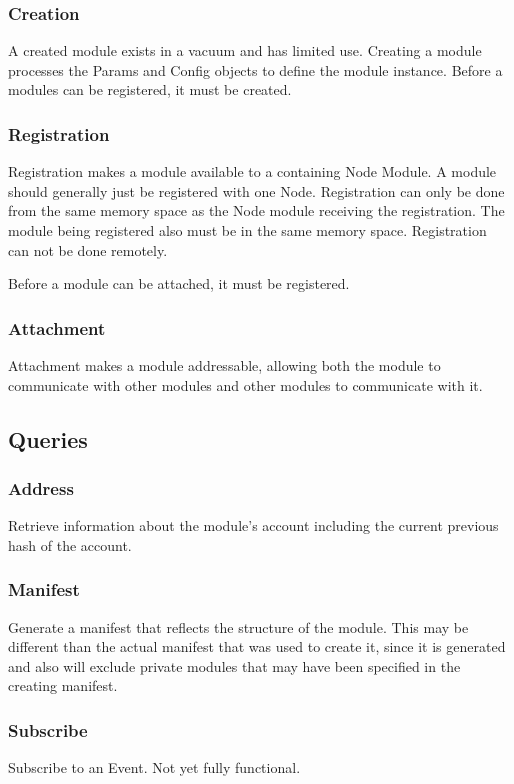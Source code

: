 \documentclass{article}
\begin{document}
\subsubsection{Creation}
A created module exists in a vacuum and has limited use.  Creating a module processes the Params and Config objects to define the module instance.  Before a modules can be registered, it must be created.

\subsubsection{Registration}
Registration makes a module available to a containing Node Module.  A module should generally just be registered with one Node.  Registration can only be done from the same memory space as the Node module receiving the registration.  The module being registered also must be in the same memory space.  Registration can not be done remotely.

Before a module can be attached, it must be registered.

\subsubsection{Attachment}
Attachment makes a module addressable, allowing both the module to communicate with other modules and other modules to communicate with it.

\subsection{Queries}
\subsubsection{Address}
Retrieve information about the module's account including the current previous hash of the account.
\subsubsection{Manifest}
Generate a manifest that reflects the structure of the module.  This may be different than the actual manifest that was used to create it, since it is generated and also will exclude private modules that may have been specified in the creating manifest.
\subsubsection{Subscribe}
Subscribe to an Event. Not yet fully functional.
\end{document}
